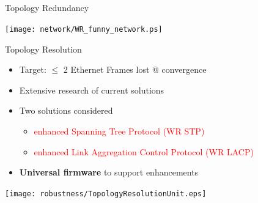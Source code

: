 \documentclass[compress,red]{beamer}
\begin{document}
\subsection{}
\begin{frame}{Topology Redundancy}

      \begin{center}
	\texttt{[image: network/WR\_funny\_network.ps]}
      \end{center}

\end{frame}
\begin{frame}{Topology Resolution}

  \begin{itemize}
    \item Target: $\leq$ 2 Ethernet Frames lost @ convergence
    \item Extensive research of current solutions
    \item Two solutions considered
    \begin{itemize}
      \item \textcolor{red}{enhanced Spanning Tree Protocol (WR STP)}
      \item \textcolor{red}{enhanced Link Aggregation Control Protocol (WR LACP)}
    \end{itemize}
    \item {\bf Universal firmware} to support enhancements
  \end{itemize}

      \begin{center}
	\texttt{[image: robustness/TopologyResolutionUnit.eps]}
      \end{center}

\end{frame}
\end{document}
